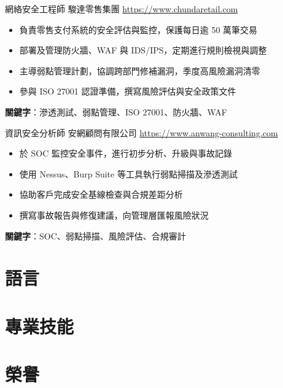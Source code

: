 \documentclass[a4paper, serif, 10pt]{moderncv}
\begin{document}
        {網絡安全工程師}
        {駿達零售集團}
        {\url{https://www.chundaretail.com}}
        {}
        {\begin{itemize}
\item 負責零售支付系統的安全評估與監控，保護每日逾 50 萬筆交易
\item 部署及管理防火牆、WAF 與 IDS/IPS，定期進行規則檢視與調整
\item 主導弱點管理計劃，協調跨部門修補漏洞，季度高風險漏洞清零
\item 參與 ISO 27001 認證準備，撰寫風險評估與安全政策文件
\end{itemize}
\textbf{關鍵字}：滲透測試、弱點管理、ISO 27001、防火牆、WAF}

        {資訊安全分析師}
        {安網顧問有限公司}
        {\url{https://www.anwang-consulting.com}}
        {}
        {\begin{itemize}
\item 於 SOC 監控安全事件，進行初步分析、升級與事故記錄
\item 使用 Nessus、Burp Suite 等工具執行弱點掃描及滲透測試
\item 協助客戶完成安全基線檢查與合規差距分析
\item 撰寫事故報告與修復建議，向管理層匯報風險狀況
\end{itemize}
\textbf{關鍵字}：SOC、弱點掃描、風險評估、合規審計}
\section{語言}

\section{專業技能}

\section{榮譽}
\end{document}
